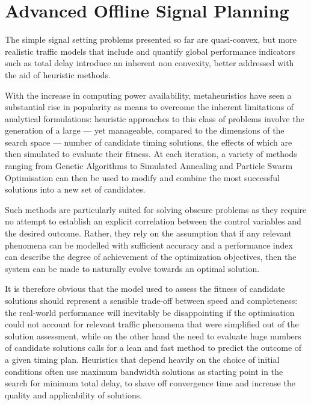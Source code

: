 \section{Advanced Offline Signal Planning}

The simple signal setting problems presented so far are quasi-convex, but more realistic traffic models that include and quantify global performance indicators such as total delay introduce an inherent non convexity, better addressed with the aid of heuristic methods.

With the increase in computing power availability, metaheuristics have seen a substantial rise in popularity as means to overcome the inherent limitations of analytical formulations: heuristic approaches to this class of problems involve the generation of a large — yet manageable, compared to the dimensions of the search space — number of candidate timing solutions, the effects of which are then simulated to evaluate their fitness. At each iteration, a variety of methods ranging from Genetic Algorithms to Simulated Annealing and Particle Swarm Optimisation can then be used to modify and combine the most successful solutions into a new set of candidates.

Such methods are particularly suited for solving obscure problems as they require no attempt to establish an explicit correlation between the control variables and the desired outcome. Rather, they rely on the assumption that if any relevant phenomena can be modelled with sufficient accuracy and a performance index can describe the degree of achievement of the optimization objectives, then the system can be made to naturally evolve towards an optimal solution.


It is therefore obvious that the model used to assess the fitness of candidate solutions should represent a sensible trade-off between speed and completeness: the real-world performance will inevitably be disappointing if the optimisation could not account for relevant traffic phenomena that were simplified out of the solution assessment, while on the other hand the need to evaluate huge numbers of candidate solutions calls for a lean and fast method to predict the outcome of a given timing plan. Heuristics that depend heavily on the choice of initial conditions often use maximum bandwidth solutions as starting point in the search for minimum total delay, to shave off convergence time and increase the quality and applicability of solutions.

